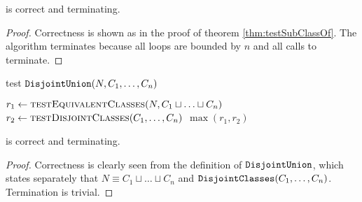 \documentclass[paper.tex]{subfiles}
\begin{document}
\begin{theorem}
   is correct and terminating.
\end{theorem}
\begin{proof}
  Correctness is shown as in the proof of theorem \ref{thm:testSubClassOf}.  The algorithm terminates because all loops are bounded by $n$ and all calls to  terminate.
\end{proof}


\begin{algorithm}[H]
  \caption{test $\mathtt{DisjointUnion}(N, C_1, \ldots, C_n)$}
  \begin{algorithmic}[1]
    \raggedright
      \State $r_1 \gets \Call{testEquivalentClasses}{N, C_1 \sqcup \ldots \sqcup C_n}$
      \State $r_2 \gets \Call{testDisjointClasses}{C_1, \ldots, C_n}$
      \State \Return $\max(r_1, r_2)$
    \EndFunction
  \end{algorithmic}
\end{algorithm}

\begin{theorem}
   is correct and terminating.
\end{theorem}
\begin{proof}
  Correctness is clearly seen from the definition of $\mathtt{DisjointUnion}$, which states separately that $N \equiv C_1 \sqcup \ldots \sqcup C_n$ and $\mathtt{DisjointClasses}(C_1, \ldots, C_n)$.  Termination is trivial.
\end{proof}
\end{document}
